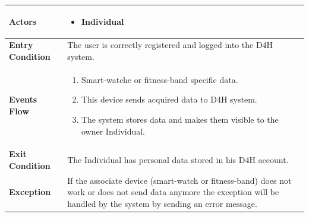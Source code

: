             \begin{table}[H]
            	\centering
                
                \begin{tabular}{|p{3cm}|p{8.2cm}|}
                    \hline
                    \textbf{Actors} & \begin{itemize}
                        \item Individual
                    \end{itemize} \\
                     \hline
                    \textbf{Entry Condition} & The user is correctly registered and logged into the D4H system. \\
                     \hline
                    \textbf{Events Flow} & \begin{enumerate}
                                                \item Smart-watche or fitness-band specific data.
                                                \item This device sends acquired data to D4H system.
                                                \item The system stores data and makes them visible to the owner Individual.
                                            \end{enumerate}\\
                     \hline
                    \textbf{Exit Condition} & The Individual has personal data stored in his D4H account.\\
                     \hline
                    \textbf{Exception} & If the associate device (smart-watch or fitness-band) does not work or does not send data anymore the exception will be handled by the system by sending an error message. \\
                     \hline
                \end{tabular}  
            \end{table} 
            
